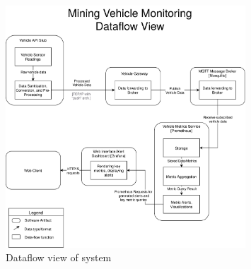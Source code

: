 \begin{figure}[H]
\centering
\includegraphics[width=0.8\textwidth]{Images/project-dataflow-view.png}
\caption{Dataflow view of system}
\label{fig:dataflow_view}
\end{figure}

\pagebreak
